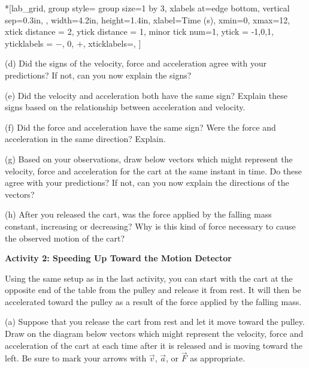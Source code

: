 
\begin{lab_groupplot}*{}[lab_grid,
	group style={
		group size=1 by 3,
		xlabels at=edge bottom,
		vertical sep=0.3in,
		},
	width=4.2in,  height=1.4in,
	xlabel=Time (s),
	xmin=0, xmax=12,
	xtick distance = 2, 
	ytick distance = 1, 
	minor tick num=1,
	ytick = {-1,0,1},
	yticklabels = {$-$, 0, $+$},
	xticklabels=\empty,
	]
\nextgroupplot[
	ymin=-1,ymax=1, 
	ylabel={Velocity (m/s)},
	]
\nextgroupplot[
	ymin=-1,ymax=1, 
	ylabel={Acceleration (m/s$^2$)},
	]
\nextgroupplot[
	ymin=-1,ymax=1, 
	ylabel={Force (N)},
	]
\end{lab_groupplot}

(d) Did the signs of the velocity, force and acceleration agree with your predictions?
If not, can you now explain the signs?
\answerspace{25mm}

(e) Did the velocity and acceleration both have the same sign? Explain these
signs based on the relationship between acceleration and velocity.
\answerspace{25mm}
\pagebreak[3]

(f) Did the force and acceleration have the same sign? Were the force and acceleration
in the same direction? Explain.
\answerspace{25mm}

(g) Based on your observations, draw below vectors which might represent the
velocity, force and acceleration for the cart at the same instant in time. Do
these agree with your predictions? If not, can you now explain the directions
of the vectors?
\answerspace{25mm}

(h) After you released the cart, was the force applied by the falling mass constant,
increasing or decreasing?  Why is this kind of force necessary to cause
the observed motion of the cart?
\answerspace{25mm}

\textbf{Activity 2: Speeding Up Toward the Motion Detector }

Using the same setup as in the last activity, you can start with the cart at
the opposite end of the table from the pulley and release it from rest.
It will then be accelerated toward the pulley as a result of the force
applied by the falling mass.

(a) Suppose that you release the cart from rest and let it move toward the pulley. Draw on the diagram below vectors which might represent the velocity,
force and acceleration of the cart at each time after it is released and is
moving toward the left. Be sure to mark your arrows with $\vec{v}$, $\vec{a}$,
or $\vec{F}$ as appropriate.

